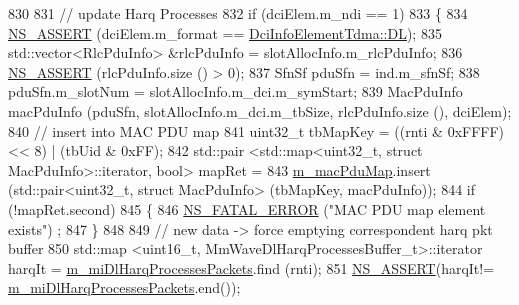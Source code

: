 \begin{DoxyCode}
830 
831                                 \textcolor{comment}{// update Harq Processes}
832                                 \textcolor{keywordflow}{if} (dciElem.m\_ndi == 1)
833                                 \{
834                                         \hyperlink{assert_8h_a6dccdb0de9b252f60088ce281c49d052}{NS\_ASSERT} (dciElem.m\_format == 
      \hyperlink{structns3_1_1DciInfoElementTdma_af998ccd3b1e03836c113d353facc76f4a6497273a219b44fa44ea3a6ea608bfcb}{DciInfoElementTdma::DL});
835                                         std::vector<RlcPduInfo> &rlcPduInfo = slotAllocInfo.m\_rlcPduInfo;
836                                         \hyperlink{assert_8h_a6dccdb0de9b252f60088ce281c49d052}{NS\_ASSERT} (rlcPduInfo.size () > 0);
837                                         SfnSf pduSfn = ind.m\_sfnSf;
838                                         pduSfn.m\_slotNum = slotAllocInfo.m\_dci.m\_symStart;
839                                         MacPduInfo macPduInfo (pduSfn, slotAllocInfo.m\_dci.m\_tbSize, 
      rlcPduInfo.size (), dciElem);
840                                         \textcolor{comment}{// insert into MAC PDU map}
841                                         uint32\_t tbMapKey = ((rnti & 0xFFFF) << 8) | (tbUid & 0xFF);
842                                         std::pair <std::map<uint32\_t, struct MacPduInfo>::iterator, \textcolor{keywordtype}{bool}> 
      mapRet =
843                                                         \hyperlink{classns3_1_1MmWaveEnbMac_a72ab38c642f56564a655e65744e7df1a}{m\_macPduMap}.insert (std::pair<uint32\_t,
       struct MacPduInfo> (tbMapKey, macPduInfo));
844                                         \textcolor{keywordflow}{if} (!mapRet.second)
845                                         \{
846                                                 \hyperlink{group__fatal_ga5131d5e3f75d7d4cbfd706ac456fdc85}{NS\_FATAL\_ERROR} (\textcolor{stringliteral}{"MAC PDU map element exists"})
      ;
847                                         \}
848 
849                                         \textcolor{comment}{// new data -> force emptying correspondent harq pkt buffer}
850                                         std::map <uint16\_t, MmWaveDlHarqProcessesBuffer\_t>::iterator harqIt
       = \hyperlink{classns3_1_1MmWaveEnbMac_aa2508718e6021eb3e796e5aeab6dc219}{m\_miDlHarqProcessesPackets}.find (rnti);
851                                         \hyperlink{assert_8h_a6dccdb0de9b252f60088ce281c49d052}{NS\_ASSERT}(harqIt!=
      \hyperlink{classns3_1_1MmWaveEnbMac_aa2508718e6021eb3e796e5aeab6dc219}{m\_miDlHarqProcessesPackets}.end());

\end{DoxyCode}
